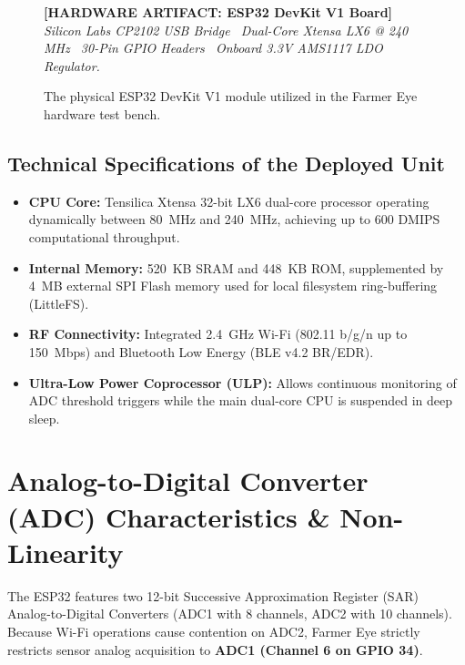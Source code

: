 \documentclass[11pt,a4paper,oneside]{report}
\begin{document}
\begin{figure}[h!]
\centering
\begin{tcolorbox}[enhanced,colback=white,colframe=nasablue,width=0.65\linewidth,arc=2mm]
\centering
\textbf{[HARDWARE ARTIFACT: ESP32 DevKit V1 Board]}\\[0.2cm]
\textit{Silicon Labs CP2102 USB Bridge \textbar\ Dual-Core Xtensa LX6 @ 240 MHz \textbar\ 30-Pin GPIO Headers \textbar\ Onboard 3.3V AMS1117 LDO Regulator.}
\end{tcolorbox}
\caption{The physical ESP32 DevKit V1 module utilized in the Farmer Eye hardware test bench.}
\label{fig:esp32_hardware}
\end{figure}

\subsection{Technical Specifications of the Deployed Unit}
\begin{itemize}[leftmargin=*]
    \item \textbf{CPU Core:} Tensilica Xtensa 32-bit LX6 dual-core processor operating dynamically between 80~MHz and 240~MHz, achieving up to 600 DMIPS computational throughput.
    \item \textbf{Internal Memory:} 520~KB SRAM and 448~KB ROM, supplemented by 4~MB external SPI Flash memory used for local filesystem ring-buffering (LittleFS).
    \item \textbf{RF Connectivity:} Integrated 2.4~GHz Wi-Fi (802.11 b/g/n up to 150~Mbps) and Bluetooth Low Energy (BLE v4.2 BR/EDR).
    \item \textbf{Ultra-Low Power Coprocessor (ULP):} Allows continuous monitoring of ADC threshold triggers while the main dual-core CPU is suspended in deep sleep.
\end{itemize}

\section{Analog-to-Digital Converter (ADC) Characteristics \& Non-Linearity}
The ESP32 features two 12-bit Successive Approximation Register (SAR) Analog-to-Digital Converters (ADC1 with 8 channels, ADC2 with 10 channels). Because Wi-Fi operations cause contention on ADC2, Farmer Eye strictly restricts sensor analog acquisition to \textbf{ADC1 (Channel 6 on GPIO 34)}.
\end{document}
